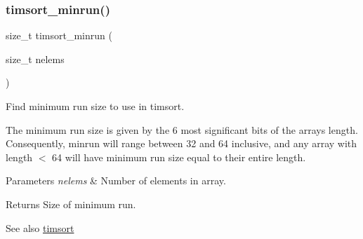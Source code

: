 \subsubsection{\texorpdfstring{timsort\+\_\+minrun()}{timsort\_minrun()}}
{\footnotesize\ttfamily size\+\_\+t timsort\+\_\+minrun (\begin{DoxyParamCaption}\item[{size\+\_\+t}]{nelems }\end{DoxyParamCaption})}



Find minimum run size to use in timsort. 

The minimum run size is given by the 6 most significant bits of the array\textquotesingle{}s length. Consequently, minrun will range between 32 and 64 inclusive, and any array with length $<$ 64 will have minimum run size equal to their entire length.


\begin{DoxyParams}{Parameters}
{\em nelems} & Number of elements in array. \\
\hline
\end{DoxyParams}
\begin{DoxyReturn}{Returns}
Size of minimum run.
\end{DoxyReturn}
\begin{DoxySeeAlso}{See also}
\hyperlink{group__Timsort_gae421187852c6c109058362a81539de0f}{timsort} 
\end{DoxySeeAlso}
